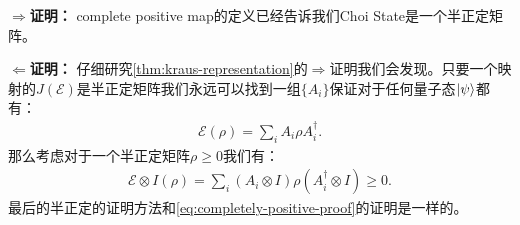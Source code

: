 \textbf{$ \Rightarrow $证明：} complete positive map的定义已经告诉我们Choi State是一个半正定矩阵。 

\textbf{$ \Leftarrow $证明：} 仔细研究\cref{thm:kraus-representation}的$ \Rightarrow $证明我们会发现。只要一个映射的$ J(\mathcal{E}) $是半正定矩阵我们永远可以找到一组$ \{A_i\} $保证对于任何量子态$ \left| \psi \right\rangle $都有：
\begin{align}
  \mathcal{E}(\rho) = \sum_i A_i \rho A_i^\dagger.
\end{align}
那么考虑对于一个半正定矩阵$ \rho\geq0 $我们有：
\begin{align}
  \mathcal{E} \otimes I(\rho) = \sum_i (A_i \otimes I) \rho (A_i^\dagger \otimes I) \geq0.
\end{align}
最后的半正定的证明方法和\cref{eq:completely-positive-proof}的证明是一样的。

